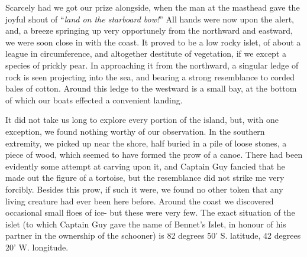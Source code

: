 Scarcely had we got our prize alongside, when the man at the masthead gave
the joyful shout of ``\emph{land on the starboard bow!}'' All hands were now upon
the alert, and, a breeze springing up very opportunely from the northward and
eastward, we were soon close in with the coast. It proved to be a low rocky
islet, of about a league in circumference, and altogether destitute of
vegetation, if we except a species of prickly pear. In approaching it from the
northward, a singular ledge of rock is seen projecting into the sea, and bearing
a strong resemblance to corded bales of cotton. Around this ledge to the
westward is a small bay, at the bottom of which our boats effected a convenient
landing. 

It did not take us long to explore every portion of the island, but, with one
exception, we found nothing worthy of our observation. In the southern
extremity, we picked up near the shore, half buried in a pile of loose stones, a
piece of wood, which seemed to have formed the prow of a canoe. There had been
evidently some attempt at carving upon it, and Captain Guy fancied that he made
out the figure of a tortoise, but the resemblance did not strike me very
forcibly. Besides this prow, if such it were, we found no other token that any
living creature had ever been here before. Around the coast we discovered
occasional small floes of ice- but these were very few. The exact situation of
the islet (to which Captain Guy gave the name of Bennet's Islet, in honour of
his partner in the ownership of the schooner) is 82 degrees 50' S. latitude, 42
degrees 20' W. longitude. 


